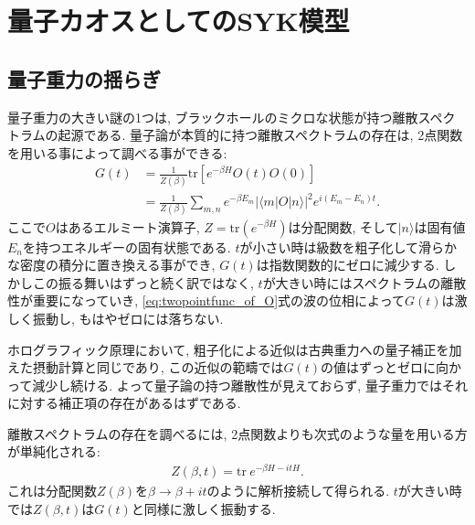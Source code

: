 \section{量子カオスとしてのSYK模型\label{sec:syk_as_quantum_chaos}}

\subsection{量子重力の揺らぎ}
量子重力の大きい謎の1つは, ブラックホールのミクロな状態が持つ離散スペクトラムの起源である. 
量子論が本質的に持つ離散スペクトラムの存在は, 2点関数を用いる事によって調べる事ができる:
\begin{align}
	G(t)
		&= \frac{1}{Z(\beta)}\mathrm{tr}\left[e^{-\beta H}O(t)O(0)\right]\nonumber\\
		&= \frac{1}{Z(\beta)}\sum_{m, n}e^{-\beta E_m}
			|\langle m|O|n \rangle|^2e^{i(E_m - E_n)t}.
	\label{eq:twopointfunc_of_O}
\end{align}
ここで$O$はあるエルミート演算子, $Z = \mathrm{tr}(e^{-\beta H})$は分配関数, 
そして$|n\rangle$は固有値$E_n$を持つエネルギーの固有状態である. 
$t$が小さい時は級数を粗子化して滑らかな密度の積分に置き換える事ができ, $G(t)$は指数関数的にゼロに減少する. 
しかしこの振る舞いはずっと続く訳ではなく, $t$が大きい時にはスペクトラムの離散性が重要になっていき, 
\eqref{eq:twopointfunc_of_O}式の波の位相によって$G(t)$は激しく振動し, もはやゼロには落ちない. 

ホログラフィック原理において, 粗子化による近似は古典重力への量子補正を加えた摂動計算と同じであり, 
この近似の範疇では$G(t)$の値はずっとゼロに向かって減少し続ける. 
よって量子論の持つ離散性が見えておらず, 量子重力ではそれに対する補正項の存在があるはずである. 

離散スペクトラムの存在を調べるには, 2点関数よりも次式のような量を用いる方が単純化される:
\begin{align}
	Z(\beta, t) = \mathrm{tr}\ e^{-\beta H - itH}.
\end{align}
これは分配関数$Z(\beta)$を$\beta\to\beta + it$のように解析接続して得られる. 
$t$が大きい時では$Z(\beta, t)$は$G(t)$と同様に激しく振動する. 


